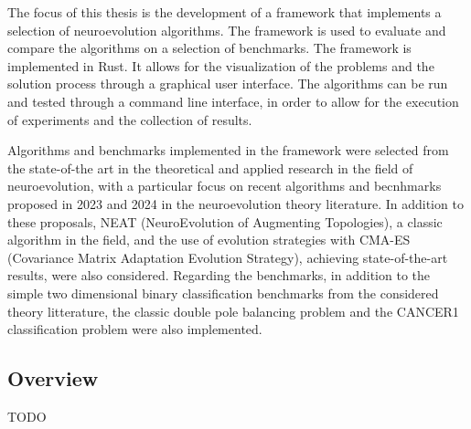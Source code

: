 The focus of this thesis is the development of a framework that implements a selection of neuroevolution algorithms.
The framework is used to evaluate and compare the algorithms on a selection of benchmarks.
The framework is implemented in Rust. It allows for the visualization of the problems and the solution process through a graphical user interface.
The algorithms can be run and tested through a command line interface, in order to allow for the execution of experiments and the collection of results.

Algorithms and benchmarks implemented in the framework were selected from the state-of-the art in the theoretical and applied research in the field of neuroevolution,
with a particular focus on recent algorithms and becnhmarks proposed in 2023 and 2024 in the neuroevolution theory literature.
In addition to these proposals, NEAT (NeuroEvolution of Augmenting Topologies), a classic algorithm in the field, and the use of evolution strategies with CMA-ES
(Covariance Matrix Adaptation Evolution Strategy), achieving state-of-the-art results, were also considered.
Regarding the benchmarks, in addition to the simple two dimensional binary classification benchmarks from the considered theory litterature, the
classic double pole balancing problem and the CANCER1 classification problem were also implemented.

\subsection{Overview}

TODO
